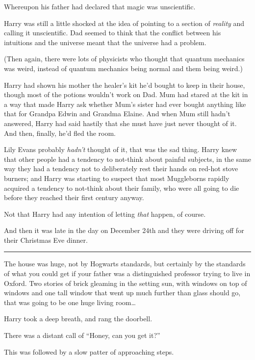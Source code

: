 Whereupon his father had declared that magic was unscientific.

Harry was still a little shocked at the idea of pointing to a section of
\emph{reality} and calling it unscientific. Dad seemed to think that the
conflict between his intuitions and the universe meant that the universe
had a problem.

(Then again, there were lots of physicists who thought that quantum
mechanics was weird, instead of quantum mechanics being normal and them
being weird.)

Harry had shown his mother the healer's kit he'd bought to keep in their
house, though most of the potions wouldn't work on Dad. Mum had stared
at the kit in a way that made Harry ask whether Mum's sister had ever
bought anything like that for Grandpa Edwin and Grandma Elaine. And when
Mum still hadn't answered, Harry had said hastily that she must have
just never thought of it. And then, finally, he'd fled the room.

Lily Evans probably \emph{hadn't} thought of it, that was the sad thing.
Harry knew that other people had a tendency to not-think about painful
subjects, in the same way they had a tendency not to deliberately rest
their hands on red-hot stove burners; and Harry was starting to suspect
that most Muggleborns rapidly acquired a tendency to not-think about
their family, who were all going to die before they reached their first
century anyway.

Not that Harry had any intention of letting \emph{that} happen, of
course.

And then it was late in the day on December 24th and they were driving
off for their Christmas Eve dinner.

\begin{center}\rule{3in}{0.4pt}\end{center}

The house was huge, not by Hogwarts standards, but certainly by the
standards of what you could get if your father was a distinguished
professor trying to live in Oxford. Two stories of brick gleaming in the
setting sun, with windows on top of windows and one tall window that
went up much further than glass should go, that was going to be one huge
living room\ldots{}

Harry took a deep breath, and rang the doorbell.

There was a distant call of ``Honey, can you get it?''

This was followed by a slow patter of approaching steps.

